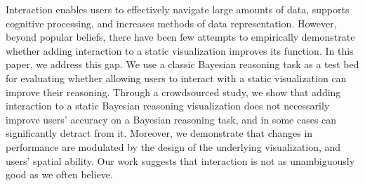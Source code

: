 Interaction enables users to effectively navigate large amounts of data, supports cognitive processing, and increases methods of data representation.  
However, beyond popular beliefs, there have been few attempts to empirically demonstrate whether adding interaction to a static visualization improves its function.    
In this paper, we address this gap. 
We use a classic Bayesian reasoning task as a test bed for evaluating whether allowing users to interact with a static visualization can improve their reasoning.  
Through a crowdsourced study, we show that adding interaction to a static Bayesian reasoning visualization does not necessarily improve users' accuracy on a Bayesian reasoning task, and in some cases can significantly detract from it. Moreover, we demonstrate that changes in performance are modulated by the design of the underlying visualization, and users' spatial ability.
Our work suggests that interaction is not as unambiguously good as we often believe.  
